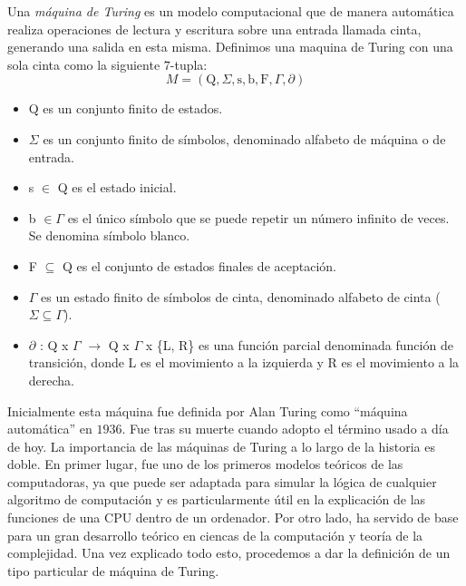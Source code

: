     \begin{definicion} \cite{MTformal}
        Una \textit{máquina de Turing} es un modelo computacional que de manera automática realiza operaciones de lectura y escritura sobre una entrada llamada cinta, generando una salida en esta misma. Definimos una maquina de Turing con una sola cinta como la siguiente $7$-tupla:
        \begin{equation}
            M = (\text{Q}, \Sigma, \text{s}, \text{b}, \text{F}, \Gamma, \partial)
        \end{equation}
        \begin{itemize}
            \item Q es un conjunto finito de estados.
            \item $\Sigma$ es un conjunto finito de símbolos, denominado alfabeto de máquina o de entrada.
            \item s $\in$ Q es el estado inicial.
            \item b $\in \Gamma$ es el único símbolo que se puede repetir un número infinito de veces. Se denomina símbolo blanco.
            \item F $\subseteq$ Q es el conjunto de estados finales de aceptación.
            \item $\Gamma$ es un estado finito de símbolos de cinta, denominado alfabeto de cinta ($\Sigma \subseteq \Gamma$).
            \item $\partial$ : Q x $\Gamma$ $\rightarrow$ Q x $\Gamma$ x \{L, R\} es una función parcial denominada función de transición, donde L es el movimiento a la izquierda y R es el movimiento a la derecha.
        \end{itemize}
    \end{definicion}

    Inicialmente esta máquina fue definida por Alan Turing como ``máquina automática'' en $1936$. Fue tras su muerte cuando adopto el término usado a día de hoy. La importancia de las máquinas de Turing a lo largo de la historia es doble. En primer lugar, fue uno de los primeros modelos teóricos de las computadoras, ya que puede ser adaptada para simular la lógica de cualquier algoritmo de computación y es particularmente útil en la explicación de las funciones de una CPU dentro de un ordenador. Por otro lado, ha servido de base para un gran desarrollo teórico en ciencas de la computación y teoría de la complejidad. Una vez explicado todo esto, procedemos a dar la definición de un tipo particular de máquina de Turing.
    
